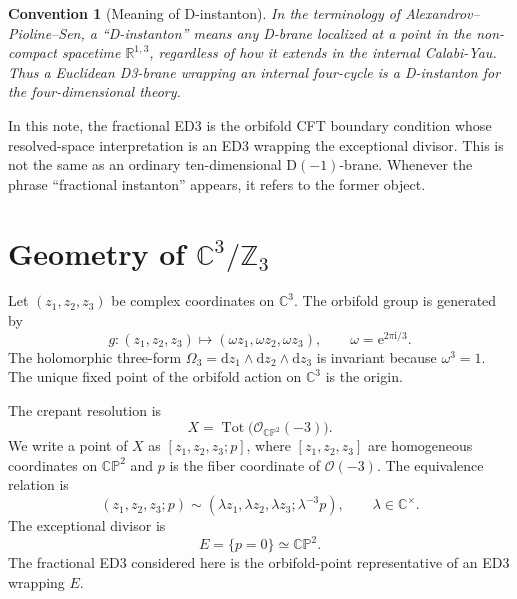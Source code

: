 \documentclass[11pt]{article}
\newcommand{\C}{\mathbb{C}}
\newcommand{\R}{\mathbb{R}}
\newcommand{\Z}{\mathbb{Z}}
\newcommand{\CP}{\mathbb{CP}}
\newcommand{\cO}{\mathcal{O}}
\newcommand{\Tot}{\operatorname{Tot}}
\newcommand{\ii}{\mathrm{i}}
\newcommand{\dd}{\mathrm{d}}
\newcommand{\e}{\mathrm{e}}
\newtheorem{convention}{Convention}
\begin{document}
\begin{convention}[Meaning of D-instanton]
In the terminology of Alexandrov--Pioline--Sen, a ``D-instanton'' means any D-brane localized
at a point in the non-compact spacetime $\R^{1,3}$, regardless of how it extends in the internal
Calabi-Yau. Thus a Euclidean D3-brane wrapping an internal four-cycle is a D-instanton for the
four-dimensional theory.
\end{convention}

In this note, the fractional ED3 is the orbifold CFT boundary condition whose resolved-space
interpretation is an ED3 wrapping the exceptional divisor. This is not the same as an ordinary
ten-dimensional D$(-1)$-brane. Whenever the phrase ``fractional instanton'' appears, it refers
to the former object.

\section{Geometry of \texorpdfstring{$\C^3/\Z_3$}{C3/Z3}}

Let $(z_1,z_2,z_3)$ be complex coordinates on $\C^3$. The orbifold group is generated by
\begin{equation}
  g : (z_1,z_2,z_3) \longmapsto
  (\omega z_1,\omega z_2,\omega z_3),
  \qquad
  \omega = \e^{2\pi \ii/3}.
  \label{eq:z3-action}
\end{equation}
The holomorphic three-form $\Omega_3=\dd z_1\wedge \dd z_2\wedge \dd z_3$ is invariant because
$\omega^3=1$. The unique fixed point of the orbifold action on $\C^3$ is the origin.

The crepant resolution is
\begin{equation}
  X = \Tot\bigl(\cO_{\CP^2}(-3)\bigr).
  \label{eq:resolution}
\end{equation}
We write a point of $X$ as $[z_1,z_2,z_3;p]$, where $[z_1,z_2,z_3]$ are homogeneous
coordinates on $\CP^2$ and $p$ is the fiber coordinate of $\cO(-3)$. The equivalence relation is
\begin{equation}
  (z_1,z_2,z_3;p)\sim
  (\lambda z_1,\lambda z_2,\lambda z_3;\lambda^{-3}p),
  \qquad
  \lambda\in\C^\times.
  \label{eq:projective-relation}
\end{equation}
The exceptional divisor is
\begin{equation}
  E=\{p=0\}\simeq \CP^2.
\end{equation}
The fractional ED3 considered here is the orbifold-point representative of an ED3 wrapping $E$.
\end{document}
